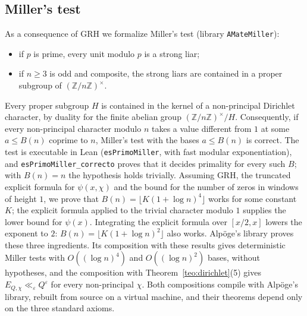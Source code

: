 \documentclass[11pt,a4paper]{amsart}
\theoremstyle{definition}
\theoremstyle{remark}
\begin{document}
\subsection*{Miller's test}
As a consequence of GRH we formalize Miller's test (library \texttt{AMateMiller}):
\begin{itemize}
\item if $p$ is prime, every unit modulo $p$ is a strong liar;
\item if $n\ge3$ is odd and composite, the strong liars are contained in a proper subgroup of $(\mathbb Z/n\mathbb Z)^\times$.
\end{itemize}
Every proper subgroup $H$ is contained in the kernel of a non-principal Dirichlet character, by duality for the finite abelian group $(\mathbb Z/n\mathbb Z)^\times/H$. Consequently, if every non-principal character modulo $n$ takes a value different from $1$ at some $a\le B(n)$ coprime to $n$, Miller's test with the bases $a\le B(n)$ is correct. The test is executable in Lean (\texttt{esPrimoMiller}, with fast modular exponentiation), and \texttt{esPrimoMiller\_correcto} proves that it decides primality for every such $B$; with $B(n)=n$ the hypothesis holds trivially. Assuming GRH, the truncated explicit formula for $\psi(x,\chi)$ and the bound for the number of zeros in windows of height $1$, we prove that $B(n)=\lfloor K(1+\log n)^4\rfloor$ works for some constant $K$; the explicit formula applied to the trivial character modulo $1$ supplies the lower bound for $\psi(x)$. Integrating the explicit formula over $[x/2,x]$ lowers the exponent to $2$: $B(n)=\lfloor K(1+\log n)^2\rfloor$ also works. Alp\"oge's library proves these three ingredients. Its composition with these results gives deterministic Miller tests with $O((\log n)^4)$ and $O((\log n)^2)$ bases, without hypotheses, and the composition with Theorem~\ref{teo:dirichlet}(5) gives $E_{Q,\chi}\ll_\varepsilon Q^\varepsilon$ for every non-principal $\chi$. Both compositions compile with Alp\"oge's library, rebuilt from source on a virtual machine, and their theorems depend only on the three standard axioms.
\end{document}
